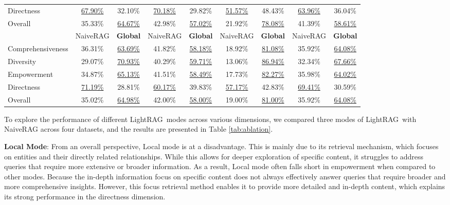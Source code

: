 \documentclass{article} %
\def\model{LightRAG}
\begin{document}
\begin{table}[h]
{\begin{tabular}{@{}lcccccccc@{}}
Directness             & \underline{67.90\%}      & 32.10\%     & \underline{70.18\%}      & 29.82\%     & \underline{51.57\%}      & 48.43\%     & \underline{63.96\%}      & 36.04\%     \\
Overall                & 35.33\%      & \underline{64.67\%}     & 42.98\%      & \underline{57.02\%}     & 21.92\%      & \underline{78.08\%}     & 41.39\%      & \underline{58.61\%}     \\
\cmidrule(lr){2-3} \cmidrule(lr){4-5} \cmidrule(lr){6-7} \cmidrule(lr){8-9}
                      & NaiveRAG & \textbf{Global} & NaiveRAG & \textbf{Global} & NaiveRAG & \textbf{Global} & NaiveRAG & \textbf{Global} \\
\midrule
Comprehensiveness      & 36.31\%      & \underline{63.69\%}     & 41.82\%      & \underline{58.18\%}     & 18.92\%      & \underline{81.08\%}     & 35.92\%      & \underline{64.08\%}     \\
Diversity              & 29.07\%      & \underline{70.93\%}     & 40.29\%      & \underline{59.71\%}     & 13.06\%      & \underline{86.94\%}     & 32.34\%      & \underline{67.66\%}     \\
Empowerment            & 34.87\%      & \underline{65.13\%}     & 41.51\%      & \underline{58.49\%}     & 17.73\%      & \underline{82.27\%}     & 35.98\%      & \underline{64.02\%}     \\
Directness             & \underline{71.19\%}      & 28.81\%     & \underline{60.17\%}      & 39.83\%     & \underline{57.17\%}      & 42.83\%     & \underline{69.41\%}      & 30.59\%     \\
Overall                & 35.02\%      & \underline{64.98\%}     & 42.00\%      & \underline{58.00\%}     & 19.00\%      & \underline{81.00\%}     & 35.92\%      & \underline{64.08\%}     \\
\bottomrule
\end{tabular}
}
\end{table}

To explore the performance of different \model\ modes across various dimensions, we compared three modes of \model\ with NaiveRAG across four datasets, and the results are presented in Table \ref{tab:ablation}. 

\textbf{Local Mode}: From an overall perspective, Local mode is at a disadvantage. This is mainly due to its retrieval mechanism, which focuses on entities and their directly related relationships. While this allows for deeper exploration of specific content, it struggles to address queries that require more extensive or broader information. As a result, Local mode often falls short in empowerment when compared to other modes. Because the in-depth information focus on specific content does not always effectively answer queries that require broader and more comprehensive insights. However, this focus retrieval method enables it to provide more detailed and in-depth content, which explains its strong performance in the directness dimension.
\end{document}

